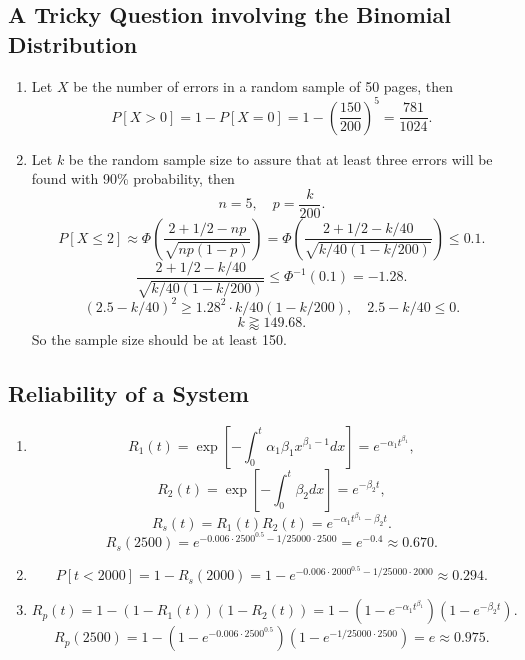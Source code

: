 \documentclass[11pt,a4paper]{article}
\begin{document}
\subsection{A Tricky Question involving the Binomial Distribution}

\begin{enumerate}[label=\roman*)]
\item
Let $X$ be the number of errors in a random sample of 50 pages, then
$$P[X>0]=1-P[X=0]=1-\left(\frac{150}{200}\right)^5=\frac{781}{1024}.$$
\item
Let $k$ be the random sample size to assure that at least three errors will be found with 90\% probability, then
$$n=5,\quad p=\frac{k}{200}.$$
$$P[X\leqslant 2]\approx\Phi\left(\frac{2+1/2-np}{\sqrt{np(1-p)}}\right)=\Phi\left(\frac{2+1/2-k/40}{\sqrt{k/40(1-k/200)}}\right)\leqslant0.1.$$
$$\frac{2+1/2-k/40}{\sqrt{k/40(1-k/200)}}\leqslant\Phi^{-1}(0.1)=-1.28.$$
$$(2.5-k/40)^2\geqslant1.28^2\cdot k/40(1-k/200),\quad 2.5-k/40\leqslant 0.$$
$$k\gtrapprox 149.68.$$
So the sample size should be at least 150.
\end{enumerate}

\subsection{Reliability of a System}
\begin{enumerate}[label=\roman*)]
\item 
$$R_1(t)=\exp\left[-\int_0^t\alpha_1\beta_1 x^{\beta_1-1}dx\right]=e^{-\alpha_1 t^{\beta_1}},$$
$$R_2(t)=\exp\left[-\int_0^t\beta_2 dx\right]=e^{-\beta_2 t},$$
$$R_s(t)=R_1(t)R_2(t)=e^{-\alpha_1t^{\beta_1}-\beta_2 t}.$$
$$R_s(2500)=e^{-0.006\cdot2500^{0.5}-1/25000\cdot2500}=e^{-0.4}\approx0.670.$$
\item
$$P[t<2000]=1-R_s(2000)=1-e^{-0.006\cdot2000^{0.5}-1/25000\cdot2000}\approx0.294.$$
\item
$$R_p(t)=1-(1-R_1(t))(1-R_2(t))=1-(1-e^{-\alpha_1 t^{\beta_1}})(1-e^{-\beta_2 t}).$$
$$R_p(2500)=1-(1-e^{-0.006\cdot2500^{0.5}})(1-e^{-1/25000\cdot2500})=e\approx0.975.$$
\end{enumerate}
\end{document}
